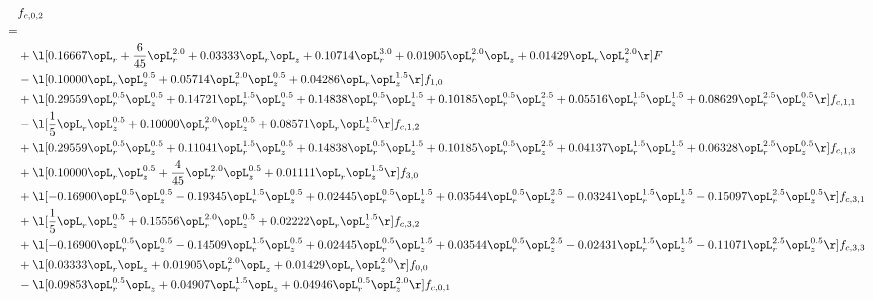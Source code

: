 \begin{alignat}{2} 
\label{eq:f_02_1} 
& f_{c,0,2} \nonumber \\ 
 = \\ 
& + \l[  0.16667 \opL_r + \frac{6}{45} \opL_r^{2.0} +  0.03333 \opL_r \opL_z +  0.10714 \opL_r^{3.0} +  0.01905 \opL_r^{2.0} \opL_z +  0.01429 \opL_r \opL_z^{2.0}  \r] F \nonumber \\ 
& - \l[  0.10000 \opL_r \opL_z^{0.5} +  0.05714 \opL_r^{2.0} \opL_z^{0.5} +  0.04286 \opL_r \opL_z^{1.5}  \r] f_{1,0} \nonumber \\ 
& + \l[  0.29559 \opL_r^{0.5} \opL_z^{0.5} +  0.14721 \opL_r^{1.5} \opL_z^{0.5} +  0.14838 \opL_r^{0.5} \opL_z^{1.5} +  0.10185 \opL_r^{0.5} \opL_z^{2.5} +  0.05516 \opL_r^{1.5} \opL_z^{1.5} +  0.08629 \opL_r^{2.5} \opL_z^{0.5}  \r] f_{c,1,1} \nonumber \\ 
& - \l[ \frac{1}{5} \opL_r \opL_z^{0.5} +  0.10000 \opL_r^{2.0} \opL_z^{0.5} +  0.08571 \opL_r \opL_z^{1.5}  \r] f_{c,1,2} \nonumber \\ 
& + \l[  0.29559 \opL_r^{0.5} \opL_z^{0.5} +  0.11041 \opL_r^{1.5} \opL_z^{0.5} +  0.14838 \opL_r^{0.5} \opL_z^{1.5} +  0.10185 \opL_r^{0.5} \opL_z^{2.5} +  0.04137 \opL_r^{1.5} \opL_z^{1.5} +  0.06328 \opL_r^{2.5} \opL_z^{0.5}  \r] f_{c,1,3} \nonumber \\ 
& + \l[  0.10000 \opL_r \opL_z^{0.5} + \frac{4}{45} \opL_r^{2.0} \opL_z^{0.5} +  0.01111 \opL_r \opL_z^{1.5}  \r] f_{3,0} \nonumber \\ 
& + \l[  -0.16900 \opL_r^{0.5} \opL_z^{0.5}   -0.19345 \opL_r^{1.5} \opL_z^{0.5} +  0.02445 \opL_r^{0.5} \opL_z^{1.5} +  0.03544 \opL_r^{0.5} \opL_z^{2.5}   -0.03241 \opL_r^{1.5} \opL_z^{1.5}   -0.15097 \opL_r^{2.5} \opL_z^{0.5}  \r] f_{c,3,1} \nonumber \\ 
& + \l[ \frac{1}{5} \opL_r \opL_z^{0.5} +  0.15556 \opL_r^{2.0} \opL_z^{0.5} +  0.02222 \opL_r \opL_z^{1.5}  \r] f_{c,3,2} \nonumber \\ 
& + \l[  -0.16900 \opL_r^{0.5} \opL_z^{0.5}   -0.14509 \opL_r^{1.5} \opL_z^{0.5} +  0.02445 \opL_r^{0.5} \opL_z^{1.5} +  0.03544 \opL_r^{0.5} \opL_z^{2.5}   -0.02431 \opL_r^{1.5} \opL_z^{1.5}   -0.11071 \opL_r^{2.5} \opL_z^{0.5}  \r] f_{c,3,3} \nonumber \\ 
& + \l[  0.03333 \opL_r \opL_z +  0.01905 \opL_r^{2.0} \opL_z +  0.01429 \opL_r \opL_z^{2.0}  \r] f_{0,0} \nonumber \\ 
& - \l[  0.09853 \opL_r^{0.5} \opL_z +  0.04907 \opL_r^{1.5} \opL_z +  0.04946 \opL_r^{0.5} \opL_z^{2.0}  \r] f_{c,0,1} \nonumber \\ 

\end{alignat}

